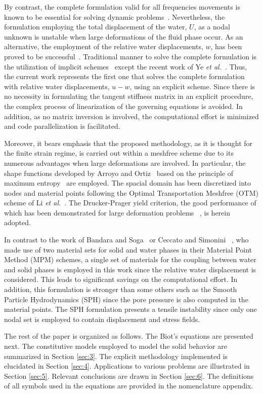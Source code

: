 \documentclass[twocolumn]{svjour3}          %
\begin{document}
{By contrast, the complete formulation valid for all frequencies movements is known to be essential for solving dynamic problems~\cite{Jeremic08,Muraleetharan09}.  Nevertheless, the formulation employing the total displacement of the water, $U$, as a nodal unknown is unstable when large deformations of the fluid phase occur. As an alternative,  the employment of the relative water displacements, $w$, has been proved to be successful~\cite{LopezQuerolB2006,Navas2016}. Traditional manner to solve the complete formulation is the utilization of implicit schemes~\cite{borja95,borja98,Armero99,Ehlers:99} except the recent work of Ye {\it et al.}~\cite{Ye10}. Thus, the current work represents the first one that solves the complete formulation with relative water displacements, $u-w$, using an explicit scheme. Since there is no necessity in formulating the tangent stiffness matrix in an explicit procedure,  the complex process of  linearization of the governing equations is avoided. In addition,  as no matrix inversion is involved, the computational effort is minimized and code parallelization is facilitated.

Moreover, it bears emphasis that the proposed methodology, as it is thought for the finite strain regime, is carried out within a meshfree scheme due to its numerous advantages when large deformations are involved. In particular,  the shape functions developed by Arroyo and Ortiz~\cite{arroyo2006} based on the principle of maximum entropy~\cite{Sukumar2004} are employed.  The  spacial domain has been discretized into nodes and material points following the Optimal Transportation Meshfree (OTM) scheme of Li {\it et al.}~\cite{li2010}. The Drucker-Prager yield criterion, the good performance of which has been demonstrated for large deformation problems ~\cite{Navas:17}, is herein adopted.

In contrast to the work of Bandara and Soga~\cite{Soga:15} or Ceccato and Simonini ~\cite{Ceccato:16}, who made use of two material sets for solid and water phases in their Material Point Method (MPM) schemes, a single set of materials for the coupling between water and solid phases is employed in this work since the relative water displacement  is considered. This leads to significant savings on the computational effort. In addition, this formulation is stronger than some others such as the Smooth Particle Hydrodynamics (SPH) since the pore pressure is also computed in the material points. The  SPH formulation presents a tensile instability since only one nodal set is employed to contain displacement and stress fields.
 
The rest of the paper is organized as follows. The Biot's equations are presented next. The constitutive models employed to model the solid behavior are summarized in Section \ref{sec:3}. The explicit methodology implemented is elucidated in Section \ref{sec:4}. Applications to various problems are illustrated in Section \ref{sec:5}. Relevant conclusions are drawn in Section \ref{sec:6}. The definitions of all symbols used in the equations are provided in the nomenclature appendix.    
}
\end{document}
